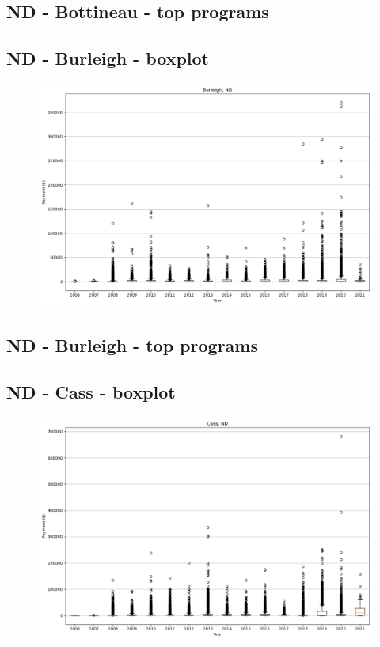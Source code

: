 \subsection*{ND - Bottineau - top programs}

\newpage
\subsection*{ND - Burleigh - boxplot}
\begin{figure}[h]
\centering
\includegraphics[width=7in]{../output/boxplots/counties/Burleigh-ND_boxplot.png}
\end{figure}


\subsection*{ND - Burleigh - top programs}

\newpage
\subsection*{ND - Cass - boxplot}
\begin{figure}[h]
\centering
\includegraphics[width=7in]{../output/boxplots/counties/Cass-ND_boxplot.png}
\end{figure}


